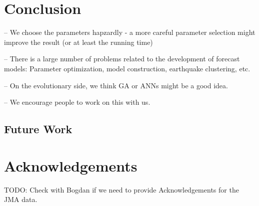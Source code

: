 \documentclass{sig-alternate}
\begin{document}





\section{Conclusion}


-- We choose the parameters hapzardly - a more careful parameter
selection might improve the result (or at least the running time)


-- There is a large number of problems related to the development of
forecast models: Parameter optimization, model construction,
earthquake clustering, etc.

-- On the evolutionary side, we think GA or ANNs might be a good idea.

-- We encourage people to work on this with us.

\subsection{Future Work}




\section*{Acknowledgements}

TODO: Check with Bogdan if we need to provide Acknowledgements for the
JMA data.




\end{document}

